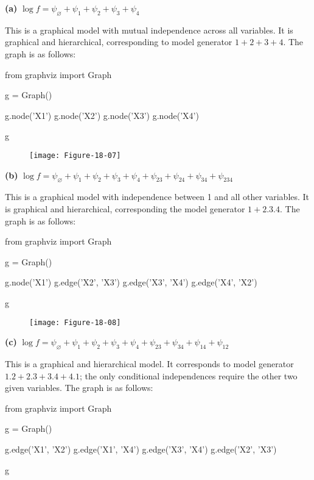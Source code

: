 \textbf{(a)}
\(\log f = \psi_\varnothing + \psi_{1} + \psi_{2} + \psi_{3} + \psi_{4}\)

This is a graphical model with mutual independence across all variables.
It is graphical and hierarchical, corresponding to model generator
\(1 + 2 + 3 + 4\). The graph is as follows:

\begin{python}
from graphviz import Graph

g = Graph()

g.node('X1')
g.node('X2')
g.node('X3')
g.node('X4')

g
\end{python}

\begin{figure}[H]
\centering
\texttt{[image: Figure-18-07]}
\end{figure}

\textbf{(b)}
\(\log f = \psi_\varnothing + \psi_{1} + \psi_{2} + \psi_{3} + \psi_{4} + \psi_{23} + \psi_{24} + \psi_{34} + \psi_{234}\)

This is a graphical model with independence between 1 and all other
variables. It is graphical and hierarchical, corresponding the model
generator \(1 + 2.3.4\). The graph is as follows:

\begin{python}
from graphviz import Graph

g = Graph()

g.node('X1')
g.edge('X2', 'X3')
g.edge('X3', 'X4')
g.edge('X4', 'X2')

g
\end{python}

\begin{figure}[H]
\centering
\texttt{[image: Figure-18-08]}
\end{figure}

\textbf{(c)}
\(\log f = \psi_\varnothing + \psi_{1} + \psi_{2} + \psi_{3} + \psi_{4} + \psi_{23} + \psi_{34} + \psi_{14} + \psi_{12}\)

This is a graphical and hierarchical model. It corresponds to model
generator \(1.2 + 2.3 + 3.4 + 4.1\); the only conditional independences
require the other two given variables. The graph is as follows:

\begin{python}
from graphviz import Graph

g = Graph()

g.edge('X1', 'X2')
g.edge('X1', 'X4')
g.edge('X3', 'X4')
g.edge('X2', 'X3')

g
\end{python}

